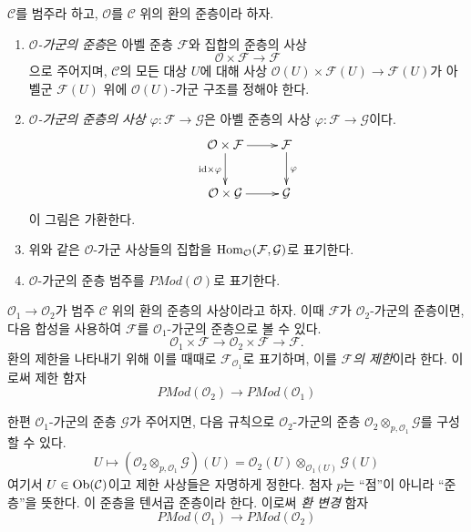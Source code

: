\begin{definition}
\label{definition-presheaf-modules}
$\mathcal{C}$를 범주라 하고, $\mathcal{O}$를 $\mathcal{C}$ 위의 환의
준층이라 하자.
\begin{enumerate}
\item {\it $\mathcal{O}$-가군의 준층}은 아벨 준층 $\mathcal{F}$와
집합의 준층의 사상
$$
\mathcal{O} \times \mathcal{F} \longrightarrow \mathcal{F}
$$
으로 주어지며, $\mathcal{C}$의 모든 대상 $U$에 대해 사상
$\mathcal{O}(U) \times \mathcal{F}(U) \to \mathcal{F}(U)$가 아벨군
$\mathcal{F}(U)$ 위에 $\mathcal{O}(U)$-가군 구조를 정해야 한다.
\item {\it $\mathcal{O}$-가군의 준층의 사상
$\varphi : \mathcal{F} \to \mathcal{G}$}은 아벨 준층의 사상
$\varphi : \mathcal{F} \to \mathcal{G}$이다.
$$
\xymatrix{
\mathcal{O} \times \mathcal{F} \ar[r] \ar[d]_{\text{id} \times \varphi} &
\mathcal{F} \ar[d]^{\varphi} \\
\mathcal{O} \times \mathcal{G} \ar[r] &
\mathcal{G}
}
$$
이 그림은 가환한다.
\item 위와 같은 $\mathcal{O}$-가군 사상들의 집합을
$\mathop{\mathrm{Hom}}\nolimits_\mathcal{O}(\mathcal{F}, \mathcal{G})$로 표기한다.
\item $\mathcal{O}$-가군의 준층 범주를 $\textit{PMod}(\mathcal{O})$로 표기한다.
\end{enumerate}
\end{definition}

\noindent
$\mathcal{O}_1 \to \mathcal{O}_2$가 범주 $\mathcal{C}$ 위의 환의 준층의
사상이라고 하자. 이때 $\mathcal{F}$가 $\mathcal{O}_2$-가군의 준층이면,
다음 합성을 사용하여 $\mathcal{F}$를 $\mathcal{O}_1$-가군의 준층으로
볼 수 있다.
$$
\mathcal{O}_1 \times \mathcal{F}
\to
\mathcal{O}_2 \times \mathcal{F}
\to
\mathcal{F}.
$$
환의 제한을 나타내기 위해 이를 때때로 $\mathcal{F}_{\mathcal{O}_1}$로
표기하며, 이를 {\it $\mathcal{F}$의 제한}이라 한다. 이로써 제한 함자
$$
\textit{PMod}(\mathcal{O}_2)
\longrightarrow
\textit{PMod}(\mathcal{O}_1)
$$

\medskip\noindent
한편 $\mathcal{O}_1$-가군의 준층 $\mathcal{G}$가 주어지면, 다음 규칙으로
$\mathcal{O}_2$-가군의 준층
$\mathcal{O}_2 \otimes_{p, \mathcal{O}_1} \mathcal{G}$를 구성할 수 있다.
$$
U \longmapsto
\left(\mathcal{O}_2 \otimes_{p, \mathcal{O}_1} \mathcal{G}\right)(U)
=
\mathcal{O}_2(U) \otimes_{\mathcal{O}_1(U)} \mathcal{G}(U)
$$
여기서 $U \in \mathop{\mathrm{Ob}}\nolimits(\mathcal{C})$이고 제한 사상들은 자명하게 정한다.
첨자 $p$는 ``점''이 아니라 ``준층''을 뜻한다. 이 준층을 텐서곱 준층이라
한다. 이로써 {\it 환 변경} 함자
$$
\textit{PMod}(\mathcal{O}_1)
\longrightarrow
\textit{PMod}(\mathcal{O}_2)
$$

